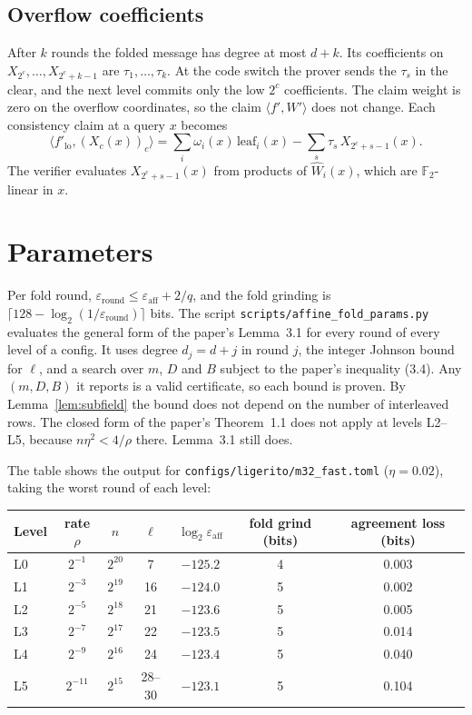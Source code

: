 \documentclass[11pt]{article}
\newcommand{\F}{\mathbb{F}}
\newcommand{\eps}{\varepsilon}
\newcommand{\What}{\widehat W}
\begin{document}
\subsection{Overflow coefficients}\label{sec:overflow}

After $k$ rounds the folded message has degree at most $d + k$. Its
coefficients on $X_{2^c}, \dots, X_{2^c + k - 1}$ are $\tau_1, \dots,
\tau_k$. At the code switch the prover sends the $\tau_s$ in the clear,
and the next level commits only the low $2^c$ coefficients. The claim
weight is zero on the overflow coordinates, so the claim
$\langle f', W'\rangle$ does not change. Each consistency claim at a
query $x$ becomes
\[
  \textstyle\langle f'_{\mathrm{lo}}, (X_c(x))_c\rangle =
  \sum_i \omega_i(x)\, \mathrm{leaf}_i(x) - \sum_s \tau_s\,
  X_{2^c + s - 1}(x).
\]
The verifier evaluates $X_{2^c + s - 1}(x)$ from products of
$\What_i(x)$, which are $\F_2$-linear in $x$.

\section{Parameters}\label{sec:params}

Per fold round, $\eps_{\mathrm{round}} \le \eps_{\mathrm{aff}} + 2/q$,
and the fold grinding is $\lceil 128 - \log_2
(1/\eps_{\mathrm{round}}) \rceil$ bits. The script
\texttt{scripts/affine\_fold\_params.py} evaluates the general form of
the paper's Lemma~3.1 for every round of every level of a config. It
uses degree $d_j = d + j$ in round $j$, the integer Johnson bound for
$\ell$, and a search over $m$, $D$ and $B$ subject to the paper's
inequality (3.4). Any $(m, D, B)$ it reports is a valid certificate,
so each bound is proven. By Lemma~\ref{lem:subfield} the bound does not
depend on the number of interleaved rows. The closed form of the
paper's Theorem~1.1 does not apply at levels L2--L5, because
$n\eta^2 < 4/\rho$ there. Lemma~3.1 still does.

The table shows the output for \texttt{configs/ligerito/m32\_fast.toml}
($\eta = 0.02$), taking the worst round of each level:

\begin{center}
\begin{tabular}{@{}lcccccc@{}}
\toprule
Level & rate $\rho$ & $n$ & $\ell$ & $\log_2 \eps_{\mathrm{aff}}$ &
fold grind (bits) & agreement loss (bits) \\
\midrule
L0 & $2^{-1}$  & $2^{20}$ & 7     & $-125.2$ & 4 & 0.003 \\
L1 & $2^{-3}$  & $2^{19}$ & 16    & $-124.0$ & 5 & 0.002 \\
L2 & $2^{-5}$  & $2^{18}$ & 21    & $-123.6$ & 5 & 0.005 \\
L3 & $2^{-7}$  & $2^{17}$ & 22    & $-123.5$ & 5 & 0.014 \\
L4 & $2^{-9}$  & $2^{16}$ & 24    & $-123.4$ & 5 & 0.040 \\
L5 & $2^{-11}$ & $2^{15}$ & 28--30 & $-123.1$ & 5 & 0.104 \\
\bottomrule
\end{tabular}
\end{center}
\end{document}
